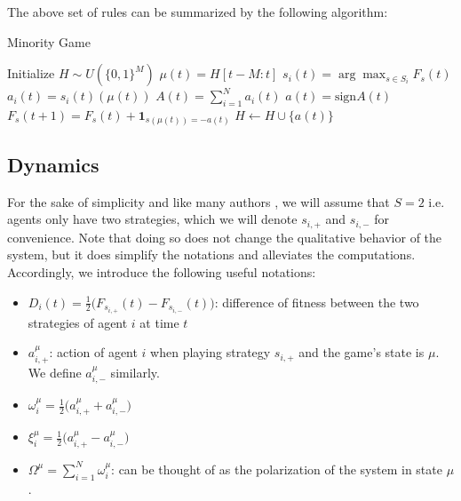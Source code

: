 \documentclass[a4paper, amsfonts, amssymb, amsmath, reprint, showkeys, nofootinbib, twoside]{revtex4-1}
\begin{document}
The above set of rules can be summarized by the following algorithm:
\begin{algorithm}
    \caption{Minority Game}
    \label{alg:minority-game}
    \begin{algorithmic}[1]
        \State Initialize $H \sim U(\{0, 1\} ^M)$
            \State $\mu(t) = H[t-M:t]$
                \State $s_i(t) = \arg\max_{s \in S_i} F_s(t)$
                \State $a_i(t) = s_i(t)(\mu(t))$
            \EndFor
            \State $A(t) = \sum_{i=1}^N a_i(t)$
            \State $a(t) = \text{sign}A(t)$
                    \State $F_s(t+1) = F_s(t) + \mathbf{1}_ {s(\mu(t)) = -a(t)}$
                \EndFor
            \EndFor
            \State $H \gets H \cup \{a(t)\}$
        \EndFor
    \end{algorithmic}
\end{algorithm}


\subsection{Dynamics}
For the sake of simplicity and like many authors \cite{Challet_1997}, we will assume that $S=2$ i.e. agents only have two strategies, which we will denote $s_{i,+}$ and $s_{i,-}$ for convenience. Note that doing so does not change the qualitative behavior of the system, but it does simplify the notations and alleviates the computations. Accordingly, we introduce the following useful notations:
\begin{itemize}
    \item $D_i(t) = \frac{1}{2}\big(F_{s_{i,+}}(t) - F_{s_{i,-}}(t)\big)$: difference of fitness between the two strategies of agent $i$ at time $t$
    \item $a_{i,+}^\mu$: action of agent $i$ when playing strategy $s_{i,+}$ and the game's state is $\mu$. We define $a_{i,-}^\mu$ similarly.
    \item $\omega_i^\mu = \frac{1}{2}\big(a_{i,+}^\mu + a_{i,-}^\mu\big)$
    \item $\xi_i^\mu = \frac{1}{2}\big(a_{i,+}^\mu - a_{i,-}^\mu\big)$
    \item $\Omega^\mu = \sum_{i=1}^N \omega_i^\mu$: can be thought of as the polarization of the system in state $\mu$.
\end{itemize}
\end{document}
